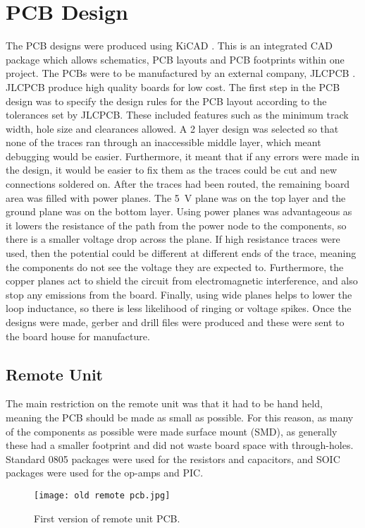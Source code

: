 \section{PCB Design}
The PCB designs were produced using KiCAD \cite{kicad}. This is an integrated CAD package which allows schematics, PCB layouts and PCB footprints within one project. The PCBs were to be manufactured by an external company, JLCPCB \cite{pcb_house}. JLCPCB produce high quality boards for low cost. The first step in the PCB design was to specify the design rules for the PCB layout according to the tolerances set by JLCPCB. These included features such as the minimum track width, hole size and clearances allowed. A 2 layer design was selected so that none of the traces ran through an inaccessible middle layer, which meant debugging would be easier. Furthermore, it meant that if any errors were made in the design, it would be easier to fix them as the traces could be cut and new connections soldered on. After the traces had been routed, the remaining board area was filled with power planes. The \SI{+5}{\volt} plane was on the top layer and the ground plane was on the bottom layer. Using power planes was advantageous as it lowers the resistance of the path from the power node to the components, so there is a smaller voltage drop across the plane. If high resistance traces were used, then the potential could be different at different ends of the trace, meaning the components do not see the voltage they are expected to. Furthermore, the copper planes act to shield the circuit from electromagnetic interference, and also stop any emissions from the board. Finally, using wide planes helps to lower the loop inductance, so there is less likelihood of ringing or voltage spikes. Once the designs were made, gerber and drill files were produced and these were sent to the board house for manufacture.


\subsection{Remote Unit}
The main restriction on the remote unit was that it had to be hand held, meaning the PCB should be made as small as possible. For this reason, as many of the components as possible were made surface mount (SMD), as generally these had a smaller footprint and did not waste board space with through-holes. Standard 0805 packages were used for the resistors and capacitors, and SOIC packages were used for the op-amps and PIC.

\begin{figure}[htbp]
	\centering
	\texttt{[image: old remote pcb.jpg]}
	\caption{First version of remote unit PCB.}
	\label{fig: old remote pcb}
\end{figure}

